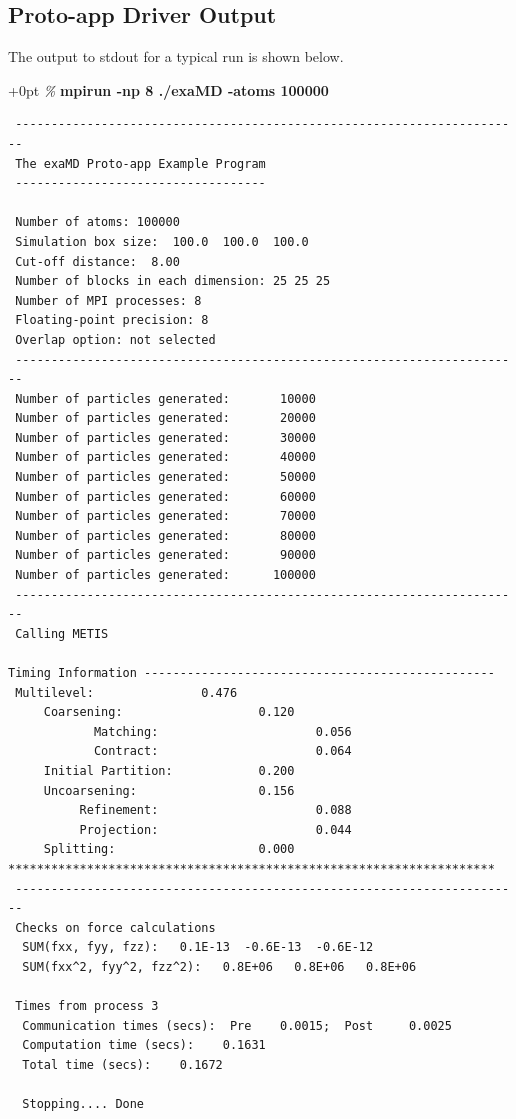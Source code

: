 \documentclass[paper=a4, fontsize=11pt,bibtotoc]{scrartcl}		%
\newenvironment{codebox}{\begin{MakeFramed}{\hsize0.8\linewidth\advance\hsize+0pt\FrameRestore}\normalfont\ttfamily}{\end{MakeFramed}}
\newcommand{\prompt}[1]{\textsl{\%} \textbf{#1}}
\begin{document}
\subsection{Proto-app Driver Output}\label{driver_output}

The output to stdout for a typical run is shown below.
\begin{codebox}
	\scriptsize
	\prompt{mpirun -np 8 ./exaMD  -atoms 100000}
\vspace{-0.18in}
\begin{verbatim}
 -----------------------------------------------------------------------
 The exaMD Proto-app Example Program
 -----------------------------------

 Number of atoms: 100000
 Simulation box size:  100.0  100.0  100.0
 Cut-off distance:  8.00
 Number of blocks in each dimension: 25 25 25
 Number of MPI processes: 8
 Floating-point precision: 8
 Overlap option: not selected
 -----------------------------------------------------------------------
 Number of particles generated:       10000
 Number of particles generated:       20000
 Number of particles generated:       30000
 Number of particles generated:       40000
 Number of particles generated:       50000
 Number of particles generated:       60000
 Number of particles generated:       70000
 Number of particles generated:       80000
 Number of particles generated:       90000
 Number of particles generated:      100000
 -----------------------------------------------------------------------
 Calling METIS

Timing Information -------------------------------------------------
 Multilevel:               0.476
     Coarsening:                   0.120
            Matching:                      0.056
            Contract:                      0.064
     Initial Partition:            0.200
     Uncoarsening:                 0.156
          Refinement:                      0.088
          Projection:                      0.044
     Splitting:                    0.000
********************************************************************
 -----------------------------------------------------------------------
 Checks on force calculations
  SUM(fxx, fyy, fzz):   0.1E-13  -0.6E-13  -0.6E-12
  SUM(fxx^2, fyy^2, fzz^2):   0.8E+06   0.8E+06   0.8E+06

 Times from process 3
  Communication times (secs):  Pre    0.0015;  Post     0.0025
  Computation time (secs):    0.1631
  Total time (secs):    0.1672

  Stopping.... Done
\end{verbatim}
\end{codebox}
\end{document}
